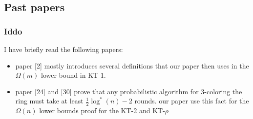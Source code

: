 \documentclass[11pt]{article}
\begin{document}
\subsection*{Past papers}
\subsubsection*{Iddo}
I have briefly read the following papers:
\begin{itemize}
    \item paper [2] mostly introduces several definitions that our paper then uses in the $\Omega(m)$ lower bound in KT-1.
    \item paper [24] and [30] prove that any probabilistic algorithm for 3-coloring the ring must take at least $\frac{1}{2}\log^*(n) -2$ rounds.
    our paper use this fact for the $\Omega(n)$ lower bounds proof for the KT-2 and KT-$\rho$
\end{itemize}
   
    
\end{document}
